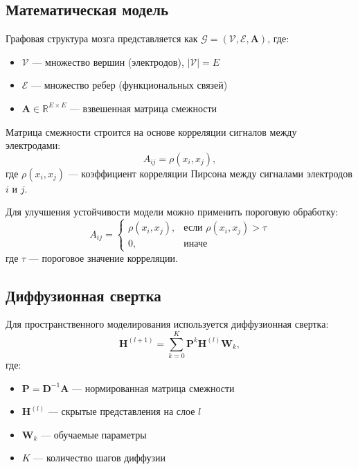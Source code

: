 \documentclass[12pt, twoside]{article}
\begin{document}
\subsection{Математическая модель}

Графовая структура мозга представляется как $\mathcal{G} = (\mathcal{V}, \mathcal{E}, \mathbf{A})$, где:
\begin{itemize}
    \item $\mathcal{V}$ — множество вершин (электродов), $|\mathcal{V}| = E$
    \item $\mathcal{E}$ — множество ребер (функциональных связей)
    \item $\mathbf{A} \in \mathbb{R}^{E \times E}$ — взвешенная матрица смежности
\end{itemize}

Матрица смежности строится на основе корреляции сигналов между электродами:
\begin{equation}
A_{ij} = \rho(x_i, x_j),
\end{equation}
где $\rho(x_i, x_j)$ — коэффициент корреляции Пирсона между сигналами электродов $i$ и $j$.

Для улучшения устойчивости модели можно применить пороговую обработку:
\begin{equation}
A_{ij} = \begin{cases}
\rho(x_i, x_j), & \text{если } \rho(x_i, x_j) > \tau \\
0, & \text{иначе}
\end{cases}
\end{equation}
где $\tau$ — пороговое значение корреляции.


\subsection{Диффузионная свертка}

Для пространственного моделирования используется диффузионная свертка:
\[
\mathbf{H}^{(l+1)} = \sum_{k=0}^{K} \mathbf{P}^k \mathbf{H}^{(l)} \mathbf{W}_k,
\]
где:
\begin{itemize}
    \item $\mathbf{P} = \mathbf{D}^{-1}\mathbf{A}$ — нормированная матрица смежности
    \item $\mathbf{H}^{(l)}$ — скрытые представления на слое $l$
    \item $\mathbf{W}_k$ — обучаемые параметры
    \item $K$ — количество шагов диффузии
\end{itemize}
\end{document}
